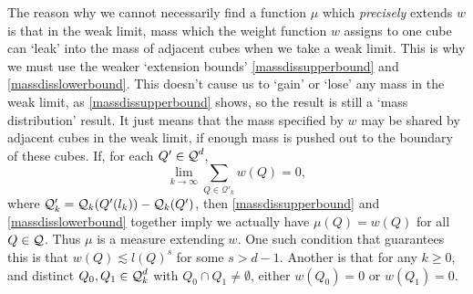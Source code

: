 \begin{remark}
	The reason why we cannot necessarily find a function $\mu$ which \emph{precisely} extends $w$ is that in the weak limit, mass which the weight function $w$ assigns to one cube can `leak' into the mass of adjacent cubes when we take a weak limit. This is why we must use the weaker `extension bounds' \eqref{massdissupperbound} and \eqref{massdisslowerbound}. This doesn't cause us to `gain' or `lose' any mass in the weak limit, as \eqref{massdissupperbound} shows, so the result is still a `mass distribution' result. It just means that the mass specified by $w$ may be shared by adjacent cubes in the weak limit, if enough mass is pushed out to the boundary of these cubes. If, for each $Q' \in \operatorname{\mathcal{Q}}^d$,
	\[ \lim_{k \to \infty} \sum_{Q \in \mathcal{Q}'_k} w(Q) = 0, \]
	where $\mathcal{Q}'_k = \operatorname{\mathcal{Q}}_k(Q'(l_k)) - \operatorname{\mathcal{Q}}_k(Q')$, then \eqref{massdissupperbound} and \eqref{massdisslowerbound} together imply we actually have $\mu(Q) = w(Q)$ for all $Q \in \operatorname{\mathcal{Q}}$. Thus $\mu$ is a measure extending $w$. One such condition that guarantees this is that $w(Q) \lesssim l(Q)^s$ for some $s > d-1$. Another is that for any $k \geq 0$, and distinct $Q_0, Q_1 \in \operatorname{\mathcal{Q}}_k^d$ with $Q_0 \cap Q_1 \neq \emptyset$, either $w(Q_0) = 0$ or $w(Q_1) = 0$.
\end{remark}


